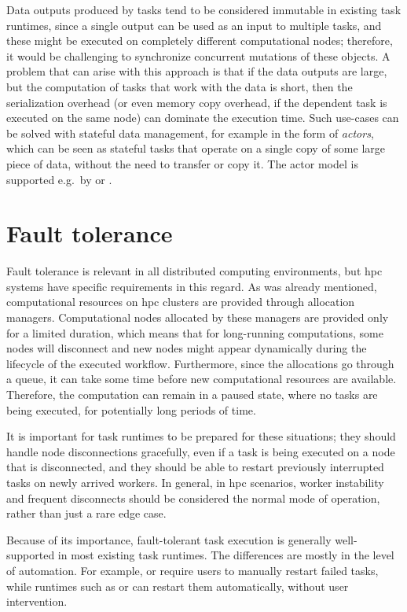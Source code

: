 Data outputs produced by tasks tend to be considered immutable in existing task runtimes, since a
single output can be used as an input to multiple tasks, and these might be executed on completely
different computational nodes; therefore, it would be challenging to synchronize concurrent
mutations of these objects. A problem that can arise with this approach is that if the data outputs
are large, but the computation of tasks that work with the data is short, then the serialization
overhead (or even memory copy overhead, if the dependent task is executed on the same node) can
dominate the execution time. Such use-cases can be solved with stateful data management, for
example in the form of \emph{actors}, which can be seen as stateful tasks that
operate on a single copy of some large piece of data, without the need to transfer or copy it.
The actor model is supported e.g.\ by \dask{} or \ray{}.

\section{Fault tolerance}
Fault tolerance is relevant in all distributed computing environments, but
\gls{hpc} systems have specific requirements in this regard. As was already
mentioned, computational resources on \gls{hpc} clusters are provided through
allocation managers. Computational nodes allocated by these managers are provided only for a limited
duration, which means that for long-running computations, some nodes will disconnect and new nodes
might appear dynamically during the lifecycle of the executed workflow. Furthermore, since the
allocations go through a queue, it can take some time before new computational resources are
available. Therefore, the computation can remain in a paused state, where no tasks are being
executed, for potentially long periods of time.

It is important for task runtimes to be prepared for these situations; they should handle node
disconnections gracefully, even if a task is being executed on a node that is disconnected, and
they should be able to restart previously interrupted tasks on newly arrived workers. In general,
in \gls{hpc} scenarios, worker instability and frequent disconnects should be
considered the normal mode of operation, rather than just a rare edge case.

Because of its importance, fault-tolerant task execution is generally well-supported in most
existing task runtimes. The differences are mostly in the level of automation. For example,
\fireworks{} or \merlin{} require users to manually restart failed tasks, while runtimes such as
\dask{} or \balsam{} can restart them automatically, without user intervention.

